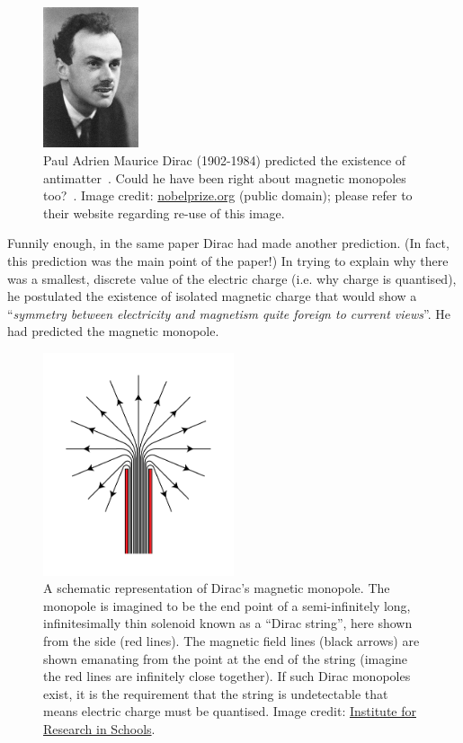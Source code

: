 %
\begin{figure}[htbp]
  \centering
  \includegraphics[width=0.25\textwidth]{assets/images/dirac-portrait/dirac-portrait.jpg}
  \caption[Paul A. M. Dirac]
  {\label{fig:pamdirac}%
Paul Adrien Maurice Dirac (1902-1984) predicted the existence of antimatter~\cite{Dirac1930}. %
Could he have been right about magnetic monopoles too?~\cite{Dirac1931}. %
Image credit: \href{https://commons.wikimedia.org/wiki/File:Dirac_4.jpg}{nobelprize.org} (public domain); %
please refer to their website regarding re-use of this image.} 
\end{figure}
%

Funnily enough, in the same paper Dirac had made another prediction.
(In fact, this prediction was the main point of the paper!)
In trying to explain why there was a smallest, discrete value of the
electric charge (i.e. why charge is quantised),
he postulated the existence of isolated magnetic charge that would show
a ``\emph{symmetry between electricity and magnetism quite foreign to current views}''.
He had predicted the magnetic monopole.

%
\begin{figure}[htbp]
  \centering
  \includegraphics[width=0.5\textwidth]{assets/images/dirac-monopole/dirac-monopole.png}
  \caption[A schematic representation of Dirac's magnetic monopole]
  {\label{fig:diracmonopole}%
A schematic representation of Dirac's magnetic monopole.
The monopole is imagined to be the end point of a semi-infinitely long,
infinitesimally thin solenoid known as a ``Dirac string'',
here shown from the side (red lines).
%
The magnetic field lines (black arrows) are shown emanating from the point
at the end of the string (imagine the red lines are infinitely close together).
If such Dirac monopoles exist, it is the requirement that the string is
undetectable that means electric charge must be quantised.
%
Image credit: \href{http://researchinschools.org}{Institute for Research in Schools}.}
\end{figure}
%

